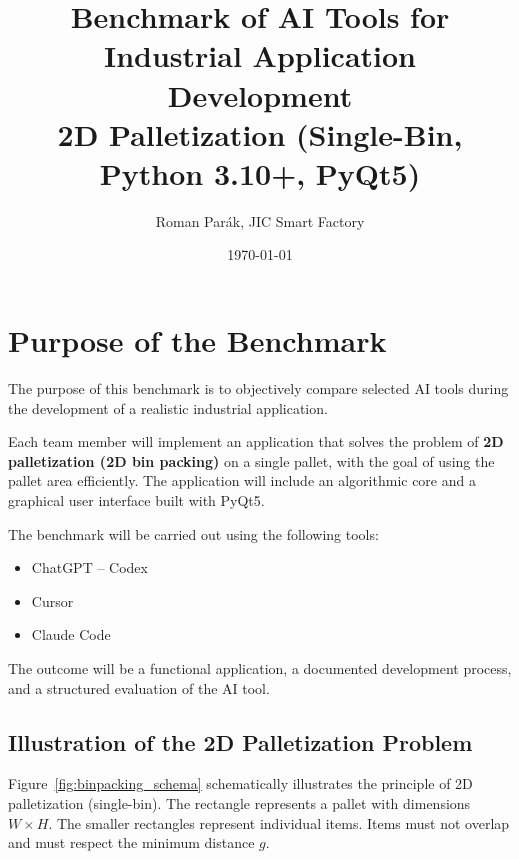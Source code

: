 \documentclass[12pt,a4paper]{article}
\title{
\textbf{\Large Benchmark of AI Tools for Industrial Application Development}\\
{\large 2D Palletization (Single-Bin, Python 3.10+, PyQt5)}
}
\author{
Roman Parák, JIC Smart Factory
}
\date{\today
}
\begin{document}
\pagestyle{plain}

\maketitle

\section{Purpose of the Benchmark}

The purpose of this benchmark is to objectively compare selected AI tools during the development of a realistic industrial application.

Each team member will implement an application that solves the problem of \textbf{2D palletization (2D bin packing)} on a single pallet, with the goal of using the pallet area efficiently. The application will include an algorithmic core and a graphical user interface built with PyQt5.

The benchmark will be carried out using the following tools:

\begin{itemize}
    \item ChatGPT -- Codex
    \item Cursor
    \item Claude Code
\end{itemize}

The outcome will be a functional application, a documented development process, and a structured evaluation of the AI tool.

\subsection{Illustration of the 2D Palletization Problem}

Figure~\ref{fig:binpacking_schema} schematically illustrates the principle
of 2D palletization (single-bin). The rectangle represents a pallet with
dimensions $W \times H$. The smaller rectangles represent individual items.
Items must not overlap and must respect the minimum distance $g$.
\end{document}
